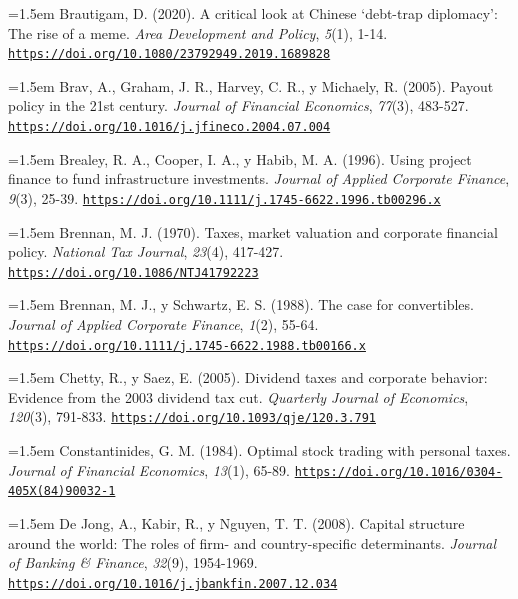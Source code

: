 \documentclass[10pt,a4paper]{article}
\begin{document}
\noindent\hangindent=1.5em Brautigam, D. (2020). A critical look at Chinese `debt-trap diplomacy': The rise of a meme. \textit{Area Development and Policy}, \textit{5}(1), 1-14. \href{https://doi.org/10.1080/23792949.2019.1689828}{\nolinkurl{https://doi.org/10.1080/23792949.2019.1689828}}

\noindent\hangindent=1.5em Brav, A., Graham, J. R., Harvey, C. R., y Michaely, R. (2005). Payout policy in the 21st century. \textit{Journal of Financial Economics}, \textit{77}(3), 483-527. \href{https://doi.org/10.1016/j.jfineco.2004.07.004}{\nolinkurl{https://doi.org/10.1016/j.jfineco.2004.07.004}}

\noindent\hangindent=1.5em Brealey, R. A., Cooper, I. A., y Habib, M. A. (1996). Using project finance to fund infrastructure investments. \textit{Journal of Applied Corporate Finance}, \textit{9}(3), 25-39. \href{https://doi.org/10.1111/j.1745-6622.1996.tb00296.x}{\nolinkurl{https://doi.org/10.1111/j.1745-6622.1996.tb00296.x}}

\noindent\hangindent=1.5em Brennan, M. J. (1970). Taxes, market valuation and corporate financial policy. \textit{National Tax Journal}, \textit{23}(4), 417-427. \href{https://doi.org/10.1086/NTJ41792223}{\nolinkurl{https://doi.org/10.1086/NTJ41792223}}

\noindent\hangindent=1.5em Brennan, M. J., y Schwartz, E. S. (1988). The case for convertibles. \textit{Journal of Applied Corporate Finance}, \textit{1}(2), 55-64. \href{https://doi.org/10.1111/j.1745-6622.1988.tb00166.x}{\nolinkurl{https://doi.org/10.1111/j.1745-6622.1988.tb00166.x}}

\noindent\hangindent=1.5em Chetty, R., y Saez, E. (2005). Dividend taxes and corporate behavior: Evidence from the 2003 dividend tax cut. \textit{Quarterly Journal of Economics}, \textit{120}(3), 791-833. \href{https://doi.org/10.1093/qje/120.3.791}{\nolinkurl{https://doi.org/10.1093/qje/120.3.791}}

\noindent\hangindent=1.5em Constantinides, G. M. (1984). Optimal stock trading with personal taxes. \textit{Journal of Financial Economics}, \textit{13}(1), 65-89. \href{https://doi.org/10.1016/0304-405X(84)90032-1}{\nolinkurl{https://doi.org/10.1016/0304-405X(84)90032-1}}

\noindent\hangindent=1.5em De Jong, A., Kabir, R., y Nguyen, T. T. (2008). Capital structure around the world: The roles of firm- and country-specific determinants. \textit{Journal of Banking \& Finance}, \textit{32}(9), 1954-1969. \href{https://doi.org/10.1016/j.jbankfin.2007.12.034}{\nolinkurl{https://doi.org/10.1016/j.jbankfin.2007.12.034}}
\end{document}
